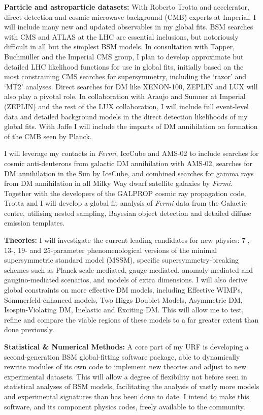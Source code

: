 \documentclass[10pt,oneside,twocolumn,a4paper]{article}
\begin{document}
\textbf{Particle and astroparticle datasets:}
With Roberto Trotta and accelerator, direct detection and cosmic microwave background (CMB) experts at Imperial, I will include many new and updated observables in my global fits.  BSM searches with CMS and ATLAS at the LHC are essential inclusions, but notoriously difficult in all but the simplest BSM models.  In consultation with Tapper, Buchm\"uller and the Imperial CMS group, I plan to develop approximate but detailed LHC likelihood functions for use in global fits, initially based on the most constraining CMS searches for supersymmetry, including the `razor' and `MT2' analyses.  Direct searches for DM like XENON-100, ZEPLIN and LUX will also play a pivotal role.  In collaboration with Araujo and Sumner at Imperial (ZEPLIN) and the rest of the LUX collaboration, I will include full event-level data and detailed background models in the direct detection likelihoods of my global fits.  With Jaffe I will include the impacts of DM annihilation on formation of the CMB seen by Planck.

I will leverage my contacts in \textit{Fermi}, IceCube and AMS-02 to include searches for cosmic anti-deuterons from galactic DM annihilation with AMS-02, searches for DM annihilation in the Sun by IceCube, and combined searches for gamma rays from DM annihilation in all Milky Way dwarf satellite galaxies by \textit{Fermi}.   Together with the developers of the \textsf{GALPROP} cosmic ray propagation code, Trotta and I will develop a global fit analysis of \textit{Fermi} data from the Galactic centre, utilising nested sampling, Bayesian object detection and detailed diffuse emission templates.

\textbf{Theories:}
I will investigate the current leading candidates for new physics: 7-, 13-, 19- and 25-parameter phenomenological versions of the minimal supersymmetric standard model (MSSM), specific supersymmetry-breaking schemes such as Planck-scale-mediated, gauge-mediated, anomaly-mediated and gaugino-mediated scenarios, and models of extra dimensions.  I will also derive global constraints on more effective DM models, including Effective WIMPs, Sommerfeld-enhanced models, Two Higgs Doublet Models, Asymmetric DM, Isospin-Violating DM, Inelastic and Exciting DM.  This will allow me to test, refine and compare the viable regions of these models to a far greater extent than done previously.

\textbf{Statistical \& Numerical Methods:}
A core part of my URF is developing a second-generation BSM global-fitting software package, able to dynamically rewrite modules of its own code to implement new theories and adjust to new experimental datasets.  This will allow a degree of flexibility not before seen in statistical analyses of BSM models, facilitating the analysis of vastly more models and experimental signatures than has been done to date.  I intend to make this software, and its component physics codes, freely available to the community.
\end{document}
